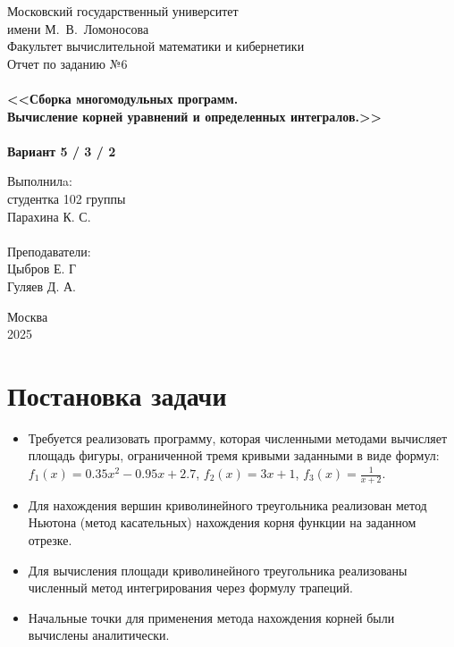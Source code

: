 \documentclass[a4paper,12pt,titlepage,finall]{article}
\begin{document}
\begin{titlepage}
    \begin{center}
	{\small \sc Московский государственный университет \\имени М.~В.~Ломоносова\\
	Факультет вычислительной математики и кибернетики\\}
	\vfill
	{\Large \sc Отчет по заданию №6}\\
	~\\
	{\large \bf <<Сборка многомодульных программ. \\
	Вычисление корней уравнений и определенных интегралов.>>}\\ 
	~\\
	{\large \bf Вариант 5 / 3 / 2}
    \end{center}
    \begin{flushright}
	\vfill {Выполнилa:\\
	студентка 102 группы\\
	Парахина К. С.\\
	~\\
	Преподаватели:\\
	Цыбров Е. Г \\
	Гуляев Д. А.}
    \end{flushright}
    \begin{center}
	\vfill
	{\small Москва\\2025}
    \end{center}
\end{titlepage}

\tableofcontents
\newpage

\section{Постановка задачи}

\begin{itemize}
  \item Требуется реализовать программу, которая численными методами вычисляет
    площадь фигуры, ограниченной тремя кривыми заданными в виде формул: $f_1(x) = 0.35x^2 - 0.95x + 2.7$,  $f_2(x) = 3x + 1$,  $f_3(x) = \frac{1}{x + 2}$.
\item Для нахождения вершин криволинейного треугольника реализован метод Ньютона (метод касательных) нахождения корня функции на заданном отрезке.
\item Для вычисления площади криволинейного треугольника реализованы численный метод интегрирования через формулу трапеций.
\item  Начальные точки для применения метода нахождения корней были вычислены аналитически.
\end{itemize}
\end{document}
